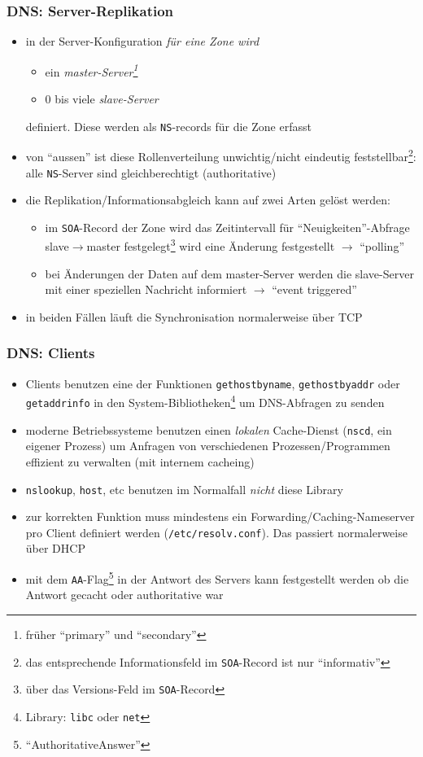\documentclass[ignorenonframetext]{beamer}
\begin{document}
\begin{frame}
\frametitle{DNS: Server-Replikation}
\begin{itemize}
  \item{in der Server-Konfiguration \em{f\"ur eine Zone} wird
    \begin{itemize}
      \item{ein \em{master}-Server\footnote{fr\"uher ``primary'' und ``secondary''}}
      \item{0 bis viele \em{slave}-Server}
    \end{itemize}
    definiert. Diese werden als \texttt{NS}-records f\"ur die Zone erfasst}
  \item{von ``aussen'' ist diese Rollenverteilung unwichtig/nicht eindeutig feststellbar\footnote{das entsprechende Informationsfeld im \texttt{SOA}-Record ist nur ``informativ''}: alle \texttt{NS}-Server sind gleichberechtigt (authoritative)}
  \item{die Replikation/Informationsabgleich kann auf zwei Arten gel\"ost werden:
    \begin{itemize}
      \item{im \texttt{SOA}-Record der Zone wird das Zeitintervall f\"ur ``Neuigkeiten''-Abfrage slave$\rightarrow$master festgelegt\footnote{\"uber das Versions-Feld im \texttt{SOA}-Record} wird eine \"Anderung festgestellt $\rightarrow$ ``polling''}
      \item{bei \"Anderungen der Daten auf dem master-Server werden die slave-Server mit einer speziellen Nachricht informiert $\rightarrow$ ``event triggered''}
     \end{itemize}}
   \item{in beiden F\"allen l\"auft die Synchronisation normalerweise \"uber TCP}
\end{itemize}
\end{frame}


\begin{frame}
\frametitle{DNS: Clients}
\begin{itemize}
	\item{Clients benutzen eine der Funktionen \texttt{gethostbyname}, \texttt{gethostbyaddr} oder \texttt{getaddrinfo} in den System-Bibliotheken\footnote{Library: \texttt{libc} oder \texttt{net}} um DNS-Abfragen zu senden}
	\item{moderne Betriebssysteme benutzen einen {\em lokalen} Cache-Dienst (\texttt{nscd}, ein eigener Prozess) um Anfragen von verschiedenen Prozessen/Programmen effizient zu verwalten (mit internem cacheing)}
	\item{\texttt{nslookup}, \texttt{host}, etc benutzen im Normalfall {\em nicht} diese Library}
	\item{zur korrekten Funktion muss mindestens ein Forwarding/Caching-Nameserver pro Client definiert werden (\texttt{/etc/resolv.conf}). Das passiert normalerweise \"uber DHCP}
	\item{mit dem \texttt{AA}-Flag\footnote{``AuthoritativeAnswer''} in der Antwort des Servers kann festgestellt werden ob die Antwort gecacht oder authoritative war}
\end{itemize}
\end{frame}
\end{document}
